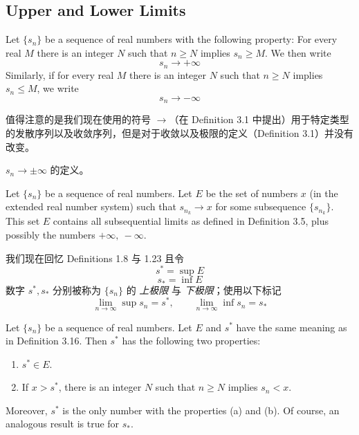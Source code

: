 \documentclass[../poma-notes.tex]{subfiles}
\begin{document}
\subsection*{Upper and Lower Limits}

\begin{definition}
  Let $\{s_n\}$ be a sequence of real numbers with the following property: For every real $M$ there is an integer $N$ such that $n \ge N$
  implies $s_n \ge M$. We then write
  \[ s_n \to + \infty \]
  Similarly, if for every real $M$ there is an integer $N$ such that $n \ge N$ implies $s_n \le M$, we write
  \[ s_n \to - \infty \]
\end{definition}

值得注意的是我们现在使用的符号 $\to$（在 Definition 3.1 中提出）用于特定类型的发散序列以及收敛序列，但是对于收敛以及极限的定义（Definition 3.1）并没有改变。

\begin{anote}
  $s_n \to \pm \infty$ 的定义。
\end{anote}

\begin{definition}
  Let $\{s_n\}$ be a sequence of real numbers. Let $E$ be the set of numbers $x$ (in the extended real number system) such that
  $s_{n_k} \to x$ for some subsequence $\{s_{n_k}\}$. This set $E$ contains all subsequential limits as defined in Definition 3.5, plus
  possibly the numbers $+\infty,\ -\infty$.
\end{definition}

我们现在回忆 Definitions 1.8 与 1.23 且令
\[ s^* = \sup E \]
\[ s_* = \inf E \]
数字 $s^*, s_*$ 分别被称为 $\{s_n\}$ 的 \textit{上极限} 与 \textit{下极限}；使用以下标记
\[ \lim_{n \to \infty} \sup s_n = s^*, \qquad \lim_{n \to \infty} \inf s_n = s_* \]

\begin{theorem}
  Let $\{s_n\}$ be a sequence of real numbers. Let $E$ and $s^*$ have the same meaning as in Definition 3.16. Then $s^*$ has the following
  two properties:
  \begin{enumerate}[label=(\alph*)]
    \item $s^* \in E$.
    \item If $x > s^*$, there is an integer $N$ such that $n \ge N$ implies $s_n < x$.
  \end{enumerate}
  Moreover, $s^*$ is the only number with the properties (a) and (b). Of course, an analogous result is true for $s_*$.
\end{theorem}
\end{document}
